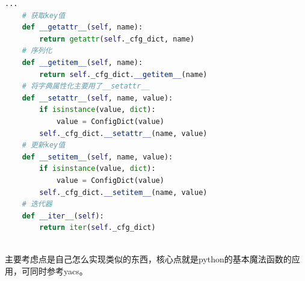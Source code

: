 \documentclass[UTF8]{ctexart}
\begin{document}
\begin{lstlisting}[language=Python]
    ...
    # 获取key值
    def __getattr__(self, name):
        return getattr(self._cfg_dict, name)
    # 序列化
    def __getitem__(self, name):
        return self._cfg_dict.__getitem__(name)
    # 将字典属性化主要用了__setattr__
    def __setattr__(self, name, value):
        if isinstance(value, dict):
            value = ConfigDict(value)
        self._cfg_dict.__setattr__(name, value)
    # 更新key值
    def __setitem__(self, name, value):
        if isinstance(value, dict):
            value = ConfigDict(value)
        self._cfg_dict.__setitem__(name, value)
    # 迭代器
    def __iter__(self):
        return iter(self._cfg_dict)
        
\end{lstlisting}

主要考虑点是自己怎么实现类似的东西，核心点就是python的基本魔法函数的应用，可同时参考yacs。
\end{document}
